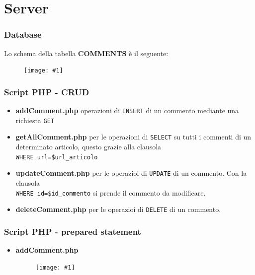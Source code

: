 \documentclass{beamer}
\def\code#1{\texttt{#1}}
\def\image[#1][#2]{
	\begin{figure}[H]
		\centering
		\texttt{[image: \#1]}
\end{figure}}
\begin{document}
	\section{Server}
		\begin{frame}	
			\frametitle{Database}
			Lo schema della tabella 
			\textbf{COMMENTS} è il seguente:
\image[images/DB_structure.png][scale=0.6]

		\end{frame}		
		\begin{frame}
			\frametitle{Script PHP - CRUD}
			\begin{itemize}
\item\textbf{addComment.php} operazioni di \code{INSERT} di un commento mediante una richiesta \code{GET}
\item\textbf{getAllComment.php} per le operazioni di \code{SELECT} su tutti i commenti di un determinato articolo, questo grazie alla clausola\\ \code{WHERE url=\$url\_articolo}
\item\textbf{updateComment.php} per le operazioi di \code{UPDATE} di un commento. Con la clausola\\ \code{WHERE id=\$id\_commento} si prende il commento da modificare.
\item\textbf{deleteComment.php} per le operazioi di \code{DELETE} di un commento. 
\end{itemize}
		\end{frame}	
		
				\begin{frame}
			\frametitle{Script PHP - prepared statement}
			\begin{itemize}
\item\textbf{addComment.php} 
\image[images/prepared.png][scale=0.5]
\end{itemize}
		\end{frame}	

		
	
\end{document}
